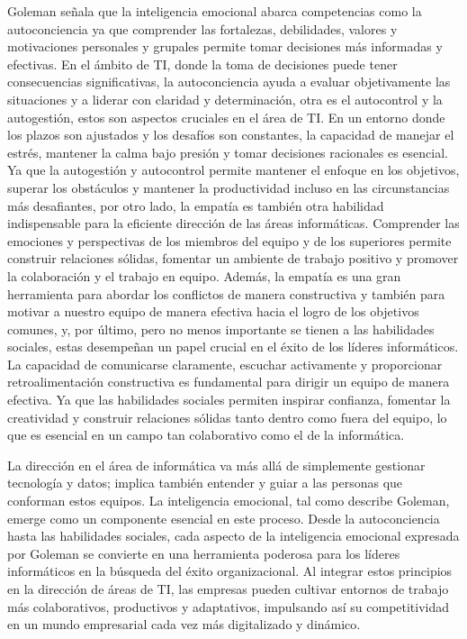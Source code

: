 \documentclass[journal]{IEEEtran}
\begin{document}
Goleman señala que la inteligencia emocional abarca competencias como la autoconciencia ya que comprender las fortalezas, debilidades, valores y motivaciones personales y grupales permite tomar decisiones más informadas y efectivas. En el ámbito de TI, donde la toma de decisiones puede tener consecuencias significativas, la autoconciencia ayuda a evaluar objetivamente las situaciones y a liderar con claridad y determinación, otra es el autocontrol y la autogestión, estos son aspectos cruciales en el área de TI. En un entorno donde los plazos son ajustados y los desafíos son constantes, la capacidad de manejar el estrés, mantener la calma bajo presión y tomar decisiones racionales es esencial. Ya que la autogestión y autocontrol permite mantener el enfoque en los objetivos, superar los obstáculos y mantener la productividad incluso en las circunstancias más desafiantes, por otro lado, la empatía es también otra habilidad indispensable para la eficiente dirección de las áreas informáticas. Comprender las emociones y perspectivas de los miembros del equipo y de los superiores permite construir relaciones sólidas, fomentar un ambiente de trabajo positivo y promover la colaboración y el trabajo en equipo. Además, la empatía es una gran herramienta para abordar los conflictos de manera constructiva y también para motivar a nuestro equipo de manera efectiva hacia el logro de los objetivos comunes, y, por último, pero no menos importante se tienen a las habilidades sociales, estas desempeñan un papel crucial en el éxito de los líderes informáticos. La capacidad de comunicarse claramente, escuchar activamente y proporcionar retroalimentación constructiva es fundamental para dirigir un equipo de manera efectiva. Ya que las habilidades sociales permiten inspirar confianza, fomentar la creatividad y construir relaciones sólidas tanto dentro como fuera del equipo, lo que es esencial en un campo tan colaborativo como el de la informática.

La dirección en el área de informática va más allá de simplemente gestionar tecnología y datos; implica también entender y guiar a las personas que conforman estos equipos. La inteligencia emocional, tal como describe Goleman, emerge como un componente esencial en este proceso. Desde la autoconciencia hasta las habilidades sociales, cada aspecto de la inteligencia emocional expresada por Goleman se convierte en una herramienta poderosa para los líderes informáticos en la búsqueda del éxito organizacional. Al integrar estos principios en la dirección de áreas de TI, las empresas pueden cultivar entornos de trabajo más colaborativos, productivos y adaptativos, impulsando así su competitividad en un mundo empresarial cada vez más digitalizado y dinámico.
\end{document}
